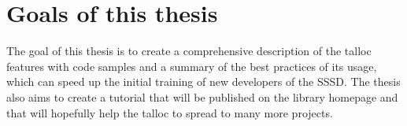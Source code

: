 \section{Goals of this thesis}

The goal of this thesis is to create a comprehensive description of the talloc
features with code samples and a summary of the best practices of its usage,
which can speed up the initial training of new developers of the SSSD. The
thesis also aims to create a tutorial that will be published on the library
homepage and that will hopefully help the talloc to spread to many more projects.

% 
% 
% 
